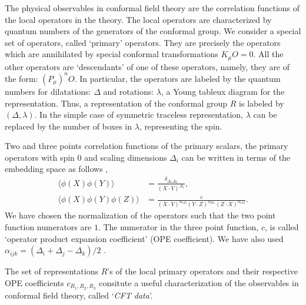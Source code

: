 The physical observables in conformal field theory are the correlation functions of the local operators in the theory.
The local operators are characterized by quantum numbers of the generators of the conformal group.
We consider a special set of operators, called `primary' operators.
They are precisely the operators which are annihilated by special conformal transformations $ K_\mu O =0 $.
All the other operators are `descendants' of one of these operators, namely, they are of the form: $ \left( P_\mu \right)^n O $.
In particular, the operators are labeled by the quantum numbers for dilatations: $ \Delta $  and rotations: $ \lambda $, a Young tableux diagram for the representation.
Thus, a representation of the conformal group $ R $ is labeled by $ \left( \Delta,\lambda \right) $.
In the simple case of symmetric traceless representation, $ \lambda $ can be replaced by the number of boxes in $ \lambda $, representing the spin.

Two and three points correlation functions of the primary scalars, the primary operators with spin $ 0 $ and scaling dimensions $ \Delta_i $ can be written in terms of the embedding space as follows \cite{Poland:2018epd},
\begin{align}
  \langle\phi\left( X \right) \phi\left( Y \right) \rangle                      & =\frac{\delta_{\Delta_1 \Delta_2}}{\left( X \cdot Y \right)^{\Delta_1}} ,                                                        \\
  \langle\phi\left( X \right) \phi\left( Y \right)\phi\left( Z \right)  \rangle & =\frac{c}{\left( X \cdot Y \right)^{\alpha_{123}}\left( Y \cdot Z \right)^{\alpha_{231}}\left( Z \cdot X \right)^{\alpha_{132}}}
  .
\end{align}
We have chosen the normalization of the operators such that the two point function numerators are $ 1 $.
The numerator in the three point function, $ c $,  is called `operator product expansion coefficient' (OPE coefficient).
We have also used $ \alpha_{ijk} = \left( \Delta_i + \Delta_j - \Delta_k \right)/2 $ .

The set of representations $ R $'s of the local primary operators and their respective OPE coefficients $ c_{R_1,R_2, R_3} $ consitute a useful characterization of the observables in conformal field theory, called `\emph{CFT data}'.

